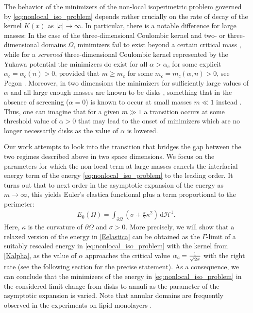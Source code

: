 \documentclass[11pt]{article}
\newcounter{statement}
\numberwithin{statement}{section}
\numberwithin{equation}{section}
\theoremstyle{remark}
\newcommand{\intd}{\, \mathrm{d}} 				%
\newcommand{\Hd}{\mathcal H}				%
\begin{document}
The behavior of the minimizers of the non-local isoperimetric problem
governed by \eqref{eq:nonlocal_iso_problem} depends rather crucially
on the rate of decay of the kernel $K(x)$ as $|x| \to \infty$. In
particular, there is a notable difference for large masses: In the
case of the three-dimensional Coulombic kernel and two- or
three-dimensional domains $\Omega$, minimizers fail to exist beyond a
certain critical mass
\cite{knupfer2013isoperimetric,muratov2014isoperimetric,
  lu2014nonexistence,frank2016nonexistence}, while for a {\em
  screened} three-dimensional Coulombic kernel represented by the
Yukawa potential the minimizers do exist for all $\alpha > \alpha_c$
for some explicit $\alpha_c = \alpha_c(n) > 0$, provided that
$m \geq m_c$ for some $m_c = m_c(\alpha, n) > 0$, see Pegon
\cite{pegon2021large}. Moreover, in two dimensions the minimizers for
sufficiently large values of $\alpha$ and all large enough masses are
known to be disks \cite{merlet2022large}, something that in the
absence of screening ($\alpha = 0$) is known to occur at small masses
$m \ll 1$ instead
\cite{knupfer2013isoperimetric,muratov2014isoperimetric,
  julin2014isoperimetric,figalli2015isoperimetry}. Thus, one can
imagine that for a given $m \gg 1$ a transition occurs at some
threshold value of $\alpha > 0$ that may lead to the onset of
minimizers which are no longer necessarily disks as the value of
$\alpha$ is lowered.

Our work attempts to look into the transition that bridges the gap
between the two regimes described above in two space dimensions. We
focus on the parameters for which the non-local term at large masses
cancels the interfacial energy term of the energy
\eqref{eq:nonlocal_iso_problem} to the leading order. It turns out
that to next order in the asymptotic expansion of the energy as
$m \to \infty$, this yields Euler's elastica functional plus a
  term proportional to the perimeter:
\begin{align}
  \label{Eelastica}
  E_0(\Omega) =  \int_{\partial \Omega}\left(
  \sigma + \frac{\pi}{2} \kappa^2\right) \intd \Hd^1.
\end{align}
Here, $\kappa$ is the curvature of $\partial \Omega$ and
$\sigma > 0$. More precisely, we will show that a relaxed version
of the energy in \eqref{Eelastica} can be obtained as the
$\Gamma$-limit of a suitably rescaled energy in
\eqref{eq:nonlocal_iso_problem} with the kernel from \eqref{Kalpha},
as the value of $\alpha$ approaches the critical value
$\alpha_c = {1 \over \sqrt{2 \pi}}$ with the right rate (see the
following section for the precise statement). As a consequence, we can
conclude that the minimizers of the energy in
\eqref{eq:nonlocal_iso_problem} in the considered limit change from
disks to annuli as the parameter of the asymptotic expansion is
varied. Note that annular domains are frequently observed in the
experiments on lipid monolayers \cite{mcconnell90}.
\end{document}
